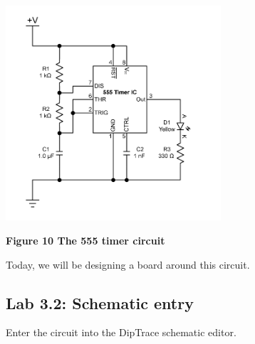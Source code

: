 \documentclass[letterpaper]{article}
\begin{document}
 \includegraphics[width=3.15in,height=3.15in]{figures/ee4document-img017.png} 

{\sffamily\bfseries\color[rgb]{0.30980393,0.5058824,0.7411765}
Figure 10 The 555 timer circuit}

{\sffamily\color[rgb]{0.30980393,0.5058824,0.7411765}
Today, we will be designing a board around this circuit.}

\subsection{Lab 3.2: Schematic entry}
\hypertarget{Toc337742697}{}{\sffamily\color[rgb]{0.30980393,0.5058824,0.7411765}
Enter the circuit into the DipTrace schematic editor.}


\bigskip
\end{document}

